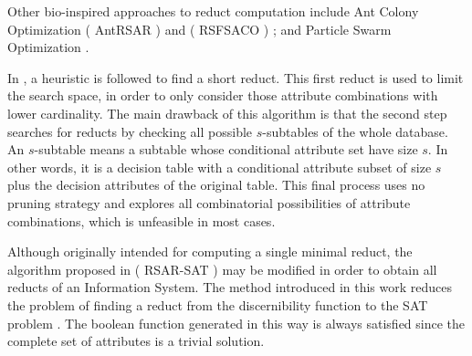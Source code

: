 \documentclass[citenumber]{llncs}
\makeatletter
\newcommand{\setword}[2]{%
  \phantomsection
  #1\def\@currentlabel{\unexpanded{#1}}\label{#2}%
}
\makeatother
\begin{document}
  Other bio-inspired approaches to reduct computation include Ant Colony Optimization (\setword{AntRSAR}{AntRSAR}) \cite{Jensen03} and (\setword{RSFSACO}{RSFSACO}) \cite{Chen10}; and Particle Swarm Optimization \cite{Wang07}.
    
  In \cite{Lin04}, a heuristic is followed to find a short reduct. This first reduct is used to limit the search
  space, in order to only consider those attribute combinations with lower cardinality. 
  The main drawback of this algorithm is that the second step searches for reducts by checking all possible 
  $s$-subtables of the whole database. An $s$-subtable means a subtable whose conditional attribute set have 
  size $s$. In other words, it is a decision table with a conditional attribute subset of size $s$ plus the decision
  attributes of the original table. This final process uses no pruning strategy and explores all combinatorial
  possibilities of attribute combinations, which is unfeasible in most cases.
  
  Although originally intended for computing a single minimal reduct, the algorithm proposed in \cite{Jensen14}  (\setword{RSAR-SAT}{RSARSAT}) may be modified in order to obtain all reducts of an Information System. The method introduced in this work reduces the problem of finding a reduct from the discernibility function to the SAT problem \cite{Davis62}. The boolean function generated in this way is always satisfied since the complete set of attributes is a trivial solution.
  
\end{document}

